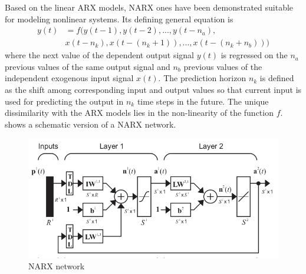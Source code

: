 
\label{subsec:ANN:NARX}

Based on the linear ARX models, NARX ones have been demonstrated 
suitable for modeling nonlinear systems. Its defining general 
equation is
\begin{equation}
\begin{split}
y(t) &=f(y(t-1),y(t-2),...,y(t-n_{a}), \\
&x(t-n_{k}),x(t-(n_{k}+1)),...,x(t-(n_{k}+n_{b})))
\end{split}
\end{equation}
where the next value of the dependent output signal $y(t)$ is 
regressed on the $n_{a}$ previous values of the same output signal 
and $n_{b}$ previous values of the independent exogenous input 
signal $x(t)$. The prediction horizon $n_{k}$ is defined as the 
shift among corresponding input and output values so that current 
input is used for predicting the output in $n_{k}$ time steps in the 
future. The unique dissimilarity with the ARX models lies in the 
non-linearity of the function $f$.  shows a schematic
version of a NARX network.

\begin{figure}[!ht]
\centering
\includegraphics[width=\textwidth]{images/narx.png}
\caption{NARX network}
\label{fig:narx}
\end{figure}



